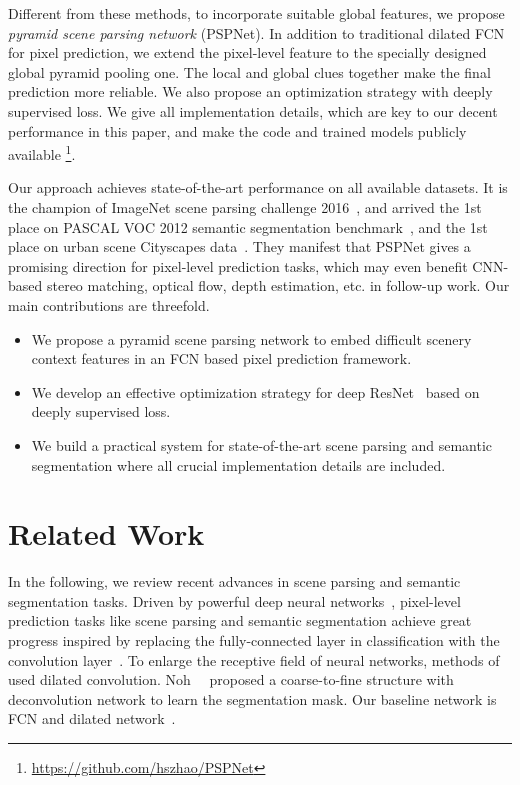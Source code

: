 \documentclass[10pt,twocolumn,letterpaper]{article}
\begin{document}
Different from these methods, to incorporate suitable global features, we propose {\it
pyramid scene parsing network} (PSPNet). In addition to traditional dilated FCN
\cite{chen2014semantic,yu2015multi} for pixel prediction, we extend the pixel-level
feature to the specially designed global pyramid pooling one. The local and global clues
together make the final prediction more reliable. We also propose an optimization
strategy with deeply supervised loss. We give all implementation details, which are key
to our decent performance in this paper, and make the code and trained models publicly
available
\footnote{\href{https://github.com/hszhao/PSPNet}{https://github.com/hszhao/PSPNet}}.

Our approach achieves state-of-the-art performance on all available datasets. It is the
champion of ImageNet scene parsing challenge 2016~\cite{zhou2016semantic}, and arrived
the 1st place on PASCAL VOC 2012 semantic segmentation
benchmark~\cite{everingham2010pascal}, and the 1st place on urban scene Cityscapes
data~\cite{cordts2016cityscapes}. They manifest that PSPNet gives a promising direction
for pixel-level prediction tasks, which may even benefit CNN-based stereo matching,
optical flow, depth estimation, etc. in follow-up work. Our main contributions are
threefold.
\begin{itemize}
\vspace{-0.1cm}
\item
We propose a pyramid scene parsing network to embed difficult scenery context features in
an FCN based pixel prediction framework. \vspace{-0.1cm}
\item
We develop an effective optimization strategy for deep ResNet~\cite{he2015deep} based on
deeply supervised loss. \vspace{-0.1cm}
\item
We build a practical system for state-of-the-art scene parsing and semantic segmentation
where all crucial implementation details are included.
\end{itemize}

\section{Related Work}

In the following, we review recent advances in scene parsing and semantic segmentation
tasks. Driven by powerful deep neural
networks~\cite{krizhevsky2012imagenet,simonyan2014very,szegedy2015going,he2015deep},
pixel-level prediction tasks like scene parsing and semantic segmentation achieve great
progress inspired by replacing the fully-connected layer in classification with the
convolution layer~\cite{long2015fully}. To enlarge the receptive field of neural
networks, methods of~\cite{chen2014semantic,yu2015multi} used dilated convolution.
Noh~\etal~\cite{noh2015learning} proposed a coarse-to-fine structure with deconvolution
network to learn the segmentation mask. Our baseline network is FCN and dilated
network~\cite{long2015fully,chen2014semantic}.
\end{document}
